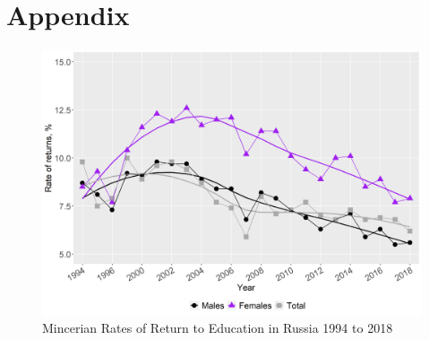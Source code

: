 \documentclass[alpha-refs]{wiley-article-02b}
\begin{document}
\printbibliography

\newpage
\section*{Appendix}
%

\setcounter{table}{0}
\renewcommand{\thetable}{A\arabic{table}}

\setcounter{figure}{0}
\renewcommand{\thefigure}{A\arabic{figure}}

\begin{center}
	\begin{figure}[htbp!]
\begin{minipage}[b]{1\linewidth}
			\centering
			\includegraphics[width=6in]{re_edu.png}
		\end{minipage}
			\caption{Mincerian Rates of Return to Education in Russia 1994 to 2018}\label{fig:7.6}
	\end{figure}
\end{center}
\end{document}
